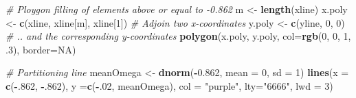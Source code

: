 \documentclass[]{article}
\newenvironment{Shaded}{\begin{snugshade}}{\end{snugshade}}
\newcommand{\KeywordTok}[1]{\textcolor[rgb]{0.13,0.29,0.53}{\textbf{#1}}}
\newcommand{\DataTypeTok}[1]{\textcolor[rgb]{0.13,0.29,0.53}{#1}}
\newcommand{\DecValTok}[1]{\textcolor[rgb]{0.00,0.00,0.81}{#1}}
\newcommand{\FloatTok}[1]{\textcolor[rgb]{0.00,0.00,0.81}{#1}}
\newcommand{\StringTok}[1]{\textcolor[rgb]{0.31,0.60,0.02}{#1}}
\newcommand{\CommentTok}[1]{\textcolor[rgb]{0.56,0.35,0.01}{\textit{#1}}}
\newcommand{\OtherTok}[1]{\textcolor[rgb]{0.56,0.35,0.01}{#1}}
\newcommand{\OperatorTok}[1]{\textcolor[rgb]{0.81,0.36,0.00}{\textbf{#1}}}
\newcommand{\NormalTok}[1]{#1}
\begin{document}
\begin{Shaded}
\begin{Highlighting}[]
\CommentTok{# Ploygon filling of elements above or equal to -0.862}
\NormalTok{m <-}\StringTok{ }\KeywordTok{length}\NormalTok{(xline)                         }
\NormalTok{x.poly <-}\StringTok{ }\KeywordTok{c}\NormalTok{(xline, xline[m], xline[}\DecValTok{1}\NormalTok{])        }\CommentTok{# Adjoin two x-coordinates}
\NormalTok{y.poly <-}\StringTok{ }\KeywordTok{c}\NormalTok{(yline, }\DecValTok{0}\NormalTok{, }\DecValTok{0}\NormalTok{)                      }\CommentTok{# .. and the corresponding y-coordinates}
\KeywordTok{polygon}\NormalTok{(x.poly, y.poly, }\DataTypeTok{col=}\KeywordTok{rgb}\NormalTok{(}\DecValTok{0}\NormalTok{, }\DecValTok{0}\NormalTok{, }\DecValTok{1}\NormalTok{, .}\DecValTok{3}\NormalTok{), }\DataTypeTok{border=}\OtherTok{NA}\NormalTok{)}

\CommentTok{# Partitioning line}
\NormalTok{meanOmega <-}\StringTok{ }\KeywordTok{dnorm}\NormalTok{(}\OperatorTok{-}\FloatTok{0.862}\NormalTok{, }\DataTypeTok{mean =} \DecValTok{0}\NormalTok{, }\DataTypeTok{sd =} \DecValTok{1}\NormalTok{)}
\KeywordTok{lines}\NormalTok{(}\DataTypeTok{x =} \KeywordTok{c}\NormalTok{(}\OperatorTok{-}\NormalTok{.}\DecValTok{862}\NormalTok{, }\OperatorTok{-}\NormalTok{.}\DecValTok{862}\NormalTok{), }\DataTypeTok{y =}\KeywordTok{c}\NormalTok{(}\OperatorTok{-}\NormalTok{.}\DecValTok{02}\NormalTok{, meanOmega), }\DataTypeTok{col =} \StringTok{"purple"}\NormalTok{, }\DataTypeTok{lty=}\StringTok{"6666"}\NormalTok{, }\DataTypeTok{lwd =} \DecValTok{3}\NormalTok{)}


\end{Highlighting}
\end{Shaded}
\end{document}
